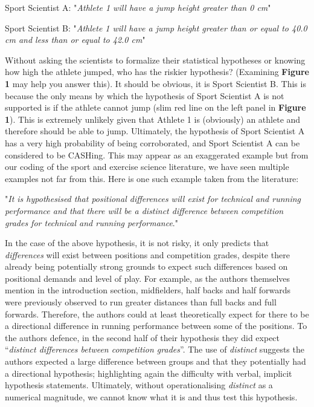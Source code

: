 \documentclass[
]{article}
\begin{document}
\begin{center}

Sport Scientist A: "\textit{Athlete 1 will have a jump height greater than 0 cm}"

Sport Scientist B: "\textit{Athlete 1 will have a jump height greater than or equal to 40.0 cm and less than or equal to 42.0 cm}"

\end{center}

Without asking the scientists to formalize their statistical hypotheses
or knowing how high the athlete jumped, who has the riskier hypothesis?
(Examining \textbf{Figure 1} may help you answer this). It should be
obvious, it is Sport Scientist B. This is because the only means by
which the hypothesis of Sport Scientist A is not supported is if the
athlete cannot jump (slim red line on the left panel in \textbf{Figure
1}). This is extremely unlikely given that Athlete 1 is (obviously) an
athlete and therefore should be able to jump. Ultimately, the hypothesis
of Sport Scientist A has a very high probability of being corroborated,
and Sport Scientist A can be considered to be CASHing. This may appear
as an exaggerated example but from our coding of the sport and exercise
science literature, we have seen multiple examples not far from this.
Here is one such example taken from the literature:

\begin{center}

"\textit{It is hypothesised that positional differences will exist for technical and running performance and that there will be a distinct difference between competition grades for technical and running performance}."

\end{center}

In the case of the above hypothesis, it is not risky, it only predicts
that \emph{differences} will exist between positions and competition
grades, despite there already being potentially strong grounds to expect
such differences based on positional demands and level of play. For
example, as the authors themselves mention in the introduction section,
midfielders, half backs and half forwards were previously observed to
run greater distances than full backs and full forwards. Therefore, the
authors could at least theoretically expect for there to be a
directional difference in running performance between some of the
positions. To the authors defence, in the second half of their
hypothesis they did expect ``\emph{distinct differences between
competition grades}''. The use of \emph{distinct} suggests the authors
expected a large difference between groups and that they potentially had
a directional hypothesis; highlighting again the difficulty with verbal,
implicit hypothesis statements. Ultimately, without operationalising
\emph{distinct} as a numerical magnitude, we cannot know what it is and
thus test this hypothesis.
\end{document}
